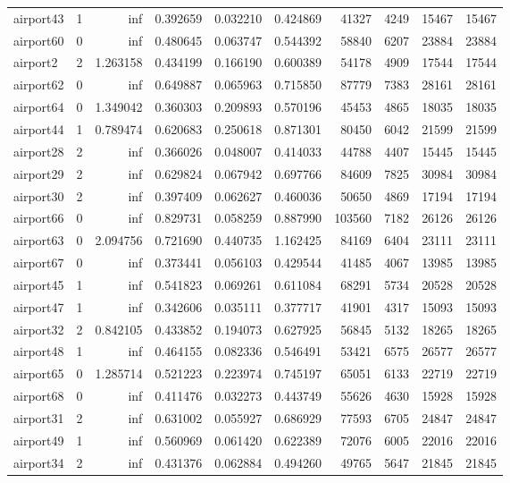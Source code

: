 \documentclass[../../../thesis.tex]{subfiles}
\begin{document}
\begin{longtable}{|l|r|r|r|r|r|r|r|r|r|}
airport43 & 1 & inf & 0.392659 & 0.032210 & 0.424869 & 41327 & 4249 & 15467 & 15467 \\
airport60 & 0 & inf & 0.480645 & 0.063747 & 0.544392 & 58840 & 6207 & 23884 & 23884 \\
airport2 & 2 & 1.263158 & 0.434199 & 0.166190 & 0.600389 & 54178 & 4909 & 17544 & 17544 \\
airport62 & 0 & inf & 0.649887 & 0.065963 & 0.715850 & 87779 & 7383 & 28161 & 28161 \\
airport64 & 0 & 1.349042 & 0.360303 & 0.209893 & 0.570196 & 45453 & 4865 & 18035 & 18035 \\
airport44 & 1 & 0.789474 & 0.620683 & 0.250618 & 0.871301 & 80450 & 6042 & 21599 & 21599 \\
airport28 & 2 & inf & 0.366026 & 0.048007 & 0.414033 & 44788 & 4407 & 15445 & 15445 \\
airport29 & 2 & inf & 0.629824 & 0.067942 & 0.697766 & 84609 & 7825 & 30984 & 30984 \\
airport30 & 2 & inf & 0.397409 & 0.062627 & 0.460036 & 50650 & 4869 & 17194 & 17194 \\
airport66 & 0 & inf & 0.829731 & 0.058259 & 0.887990 & 103560 & 7182 & 26126 & 26126 \\
airport63 & 0 & 2.094756 & 0.721690 & 0.440735 & 1.162425 & 84169 & 6404 & 23111 & 23111 \\
airport67 & 0 & inf & 0.373441 & 0.056103 & 0.429544 & 41485 & 4067 & 13985 & 13985 \\
airport45 & 1 & inf & 0.541823 & 0.069261 & 0.611084 & 68291 & 5734 & 20528 & 20528 \\
airport47 & 1 & inf & 0.342606 & 0.035111 & 0.377717 & 41901 & 4317 & 15093 & 15093 \\
airport32 & 2 & 0.842105 & 0.433852 & 0.194073 & 0.627925 & 56845 & 5132 & 18265 & 18265 \\
airport48 & 1 & inf & 0.464155 & 0.082336 & 0.546491 & 53421 & 6575 & 26577 & 26577 \\
airport65 & 0 & 1.285714 & 0.521223 & 0.223974 & 0.745197 & 65051 & 6133 & 22719 & 22719 \\
airport68 & 0 & inf & 0.411476 & 0.032273 & 0.443749 & 55626 & 4630 & 15928 & 15928 \\
airport31 & 2 & inf & 0.631002 & 0.055927 & 0.686929 & 77593 & 6705 & 24847 & 24847 \\
airport49 & 1 & inf & 0.560969 & 0.061420 & 0.622389 & 72076 & 6005 & 22016 & 22016 \\
airport34 & 2 & inf & 0.431376 & 0.062884 & 0.494260 & 49765 & 5647 & 21845 & 21845 \\

\end{longtable}
\end{document}
